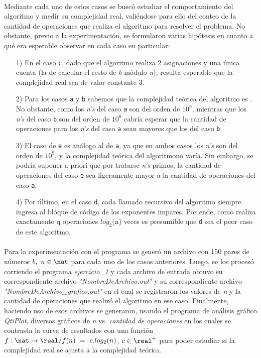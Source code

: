 \paragraph{}
Mediante cada uno de estos casos se buscó estudiar el comportamiento del algoritmo y medir su complejidad real, valiéndose para ello del conteo de la cantidad de operaciones que realiza el algoritmo para resolver el problema. No obstante, previo a la experimentación, se formularon varias hipótesis en cuanto a qué era esperable observar en cada caso en particular:
	\begin{itemize}
		\item[1)]{En el caso \texttt{c}, dado que el algoritmo realiza 2 asignaciones y una única cuenta (la de calcular el resto de \textit{b} módulo \textit{n}), resulta esperable que la complejidad real sea de valor constante 3.}
		\item[2)]{Para los casos \texttt{a} y \texttt{b} sabemos que la complejidad teórica del algoritmo es . No obstante, como los \textit{n's} del caso \texttt{a} son del orden de $10^9$, mientras que los \textit{n's} del caso \texttt{b} son del orden de $10^6$ cabría esperar que la cantidad de operaciones para los \textit{n's} del caso \texttt{a} sean mayores que los del caso \texttt{b}}. 
		\item[3)]{El caso de \texttt{e} es análogo al de \texttt{a}, ya que en ambos casos los \textit{n's} son del orden de $10^9$, y la complejidad teórica del algoritmono varía. Sin embargo, se podría suponer a priori que por tratarse \textit{n's} primos, la cantidad de operaciones del caso \texttt{e} sea ligeramente mayor a la cantidad de operaciones del caso \texttt{a}.}
		\item[4)]{Por último, en el caso \texttt{d}, cada llamado recursivo del algoritmo siempre ingresa al blóque de código de los exponentes impares. Por ende, como realiza exactamente q operaciones $log_2$(n) veces es presumible que \texttt{d} sea el peor caso de este algoritmo.}
	\end{itemize}

\paragraph{}
Para la experimentación con el programa se generó un archivo con 150 pares de números $b,\ n \in \nat$ para cada uno de los casos anteriores. Luego, se los procesó corriendo el programa \textit{ejercicio\_1} y cada archivo de entrada obtuvo su correspondiente archivo \textit{"NombreDeArchivo.out"} y su correspondiente archivo \textit{"NombreDeArchivo\_grafico.out"} en el cual se registraron los valores de \textit{n} y la cantidad de operaciones que realizó el algoritmo en ese caso. Finalmente, haciendo uso de esos archivos se generaron, usando el programa de análisis gráfico \textit{QtiPlot}, diversos gráficos de \textit{n} vs. \textit{cantidad de operaciones} en los cuales se contrasta la curva de resultados con una función $f: \nat \rightarrow \real / f(n)\ =\ c.log_2(n)$, $c \in \real^+$ para poder estudiar si la complejidad real se ajusta a la complejidad teórica.\\

